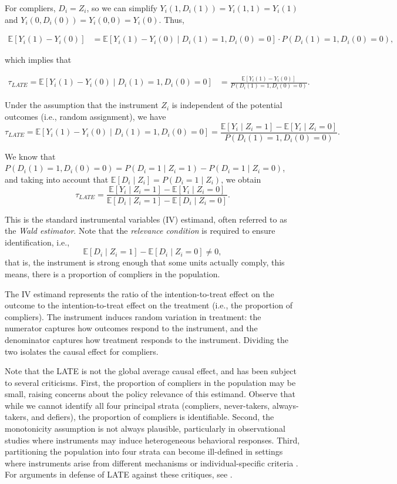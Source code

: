 For compliers, $D_i = Z_i$, so we can simplify $Y_i(1,D_i(1)) = Y_i(1,1) = Y_i(1)$ and $Y_i(0,D_i(0)) = Y_i(0,0) = Y_i(0)$. Thus,

\begin{align*}
	\mathbb{E}[Y_i(1) - Y_i(0)] 
	&= \mathbb{E}[Y_i(1) - Y_i(0) \mid D_i(1) = 1, D_i(0) = 0] \cdot P(D_i(1) = 1, D_i(0) = 0),
\end{align*}

which implies that

\begin{align*}
	\tau_{LATE} = \mathbb{E}[Y_i(1) - Y_i(0) \mid D_i(1) = 1, D_i(0) = 0] 
	&= \frac{\mathbb{E}[Y_i(1) - Y_i(0)]}{P(D_i(1) = 1, D_i(0) = 0)}.
\end{align*}

Under the assumption that the instrument \( Z_i \) is independent of the potential outcomes (i.e., random assignment), we have
\[
\tau_{LATE} = \mathbb{E}[Y_i(1) - Y_i(0) \mid D_i(1) = 1, D_i(0) = 0] 
= \frac{\mathbb{E}[Y_i \mid Z_i = 1] - \mathbb{E}[Y_i \mid Z_i = 0]}{P(D_i(1) = 1, D_i(0) = 0)}.
\]

We know that $P(D_i(1) = 1, D_i(0) = 0)=P(D_i = 1 \mid Z_i = 1) - P(D_i = 1 \mid Z_i = 0)$, and taking into account that \( \mathbb{E}[D_i \mid Z_i] = P(D_i = 1 \mid Z_i) \), we obtain
\[
\tau_{LATE} = \frac{\mathbb{E}[Y_i \mid Z_i = 1] - \mathbb{E}[Y_i \mid Z_i = 0]}{\mathbb{E}[D_i \mid Z_i = 1] - \mathbb{E}[D_i \mid Z_i = 0]}.
\]

This is the standard instrumental variables (IV) estimand, often referred to as the \textit{Wald estimator}. Note that the \textit{relevance condition} is required to ensure identification, i.e.,
\[
\mathbb{E}[D_i \mid Z_i = 1] - \mathbb{E}[D_i \mid Z_i = 0] \neq 0,
\]
that is, the instrument is strong enough that some units actually comply, this means, there is a proportion of compliers in the population.

The IV estimand represents the ratio of the intention-to-treat effect on the outcome to the intention-to-treat effect on the treatment (i.e., the proportion of compliers). The instrument induces random variation in treatment: the numerator captures how outcomes respond to the instrument, and the denominator captures how treatment responds to the instrument. Dividing the two isolates the causal effect for compliers.

Note that the LATE is not the global average causal effect, and has been subject to several criticisms. First, the proportion of compliers in the population may be small, raising concerns about the policy relevance of this estimand. Observe that while we cannot identify all four principal strata (compliers, never-takers, always-takers, and defiers), the proportion of compliers is identifiable. Second, the monotonicity assumption is not always plausible, particularly in observational studies where instruments may induce heterogeneous behavioral responses. Third, partitioning the population into four strata can become ill-defined in settings where instruments arise from different mechanisms or individual-specific criteria \cite{deaton2010instruments,hernan2020causal}. For arguments in defense of LATE against these critiques, see \cite{angrist2010better}.\\

